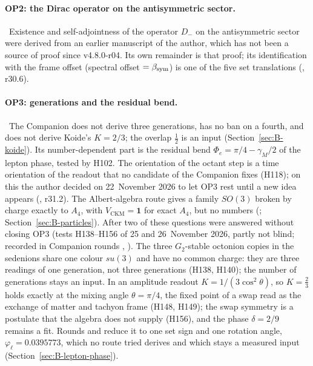 \paragraph{OP2: the Dirac operator on the antisymmetric sector.} \Open\ Existence and self-adjointness of the operator $D_-$
on the antisymmetric sector were derived from an earlier manuscript of the author, which has not been a source of proof since v4.8.0-r04.
Its own remainder is that proof; its identification with the frame offset (spectral offset $=\beta_{\mathrm{sym}}$) is one of the five
set translations (, r30.6).

\paragraph{OP3: generations and the residual bend.} \Open\ The Companion does not derive three generations, has no ban on
a fourth, and does not derive Koide's $K=2/3$; the overlap $\tfrac12$ is an input (Section~\ref{sec:B-koide}). Its number-dependent part is
the residual bend $\Phi_e=\pi/4-\gamma_M/2$ of the lepton phase, tested by H102. The orientation of the octant step is a
time orientation of the readout that no candidate of the Companion fixes (H118); on this the author decided on 22~November
2026 to let OP3 rest until a new idea appears (, r31.2). The Albert-algebra route gives a family $SO(3)$ broken by charge
exactly to $A_4$, with $V_{\mathrm{CKM}}=\mathbf 1$ for exact $A_4$, but no numbers (; Section~\ref{sec:B-particles}).
After  two of these questions were answered without closing OP3 (tests H138--H156 of 25 and 26~November 2026, partly
not blind; recorded in Companion rounds , ). The three $G_2$-stable octonion copies in the sedenions share one colour
$su(3)$ and have no common charge: they are three readings of one generation, not three generations (H138, H140); the number of generations stays an input. In an
amplitude readout $K=1/(3\cos^2\theta)$, so $K=\tfrac23$ holds exactly at the mixing angle $\theta=\pi/4$, the fixed point of
a swap read as the exchange of matter and tachyon frame (H148, H149); the swap symmetry is a postulate that the algebra
does not supply (H156), and the phase $\delta=2/9$ remains a fit. Rounds  and  reduce it to one set sign and one
rotation angle, $\varphi_\ell=0.0395773$, which no route tried derives and which stays a measured input (Section~\ref{sec:B-lepton-phase}).

